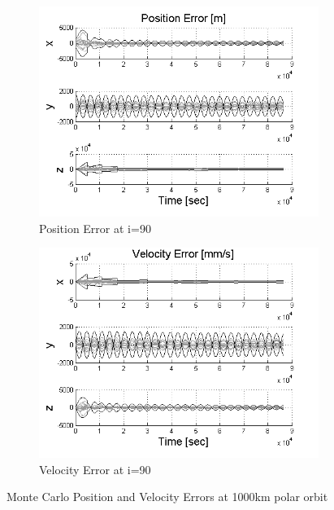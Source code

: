 \documentclass[]{aiaa-tc}%
\begin{document}
\begin{figure}[ht!]
\centering
\begin{subfigure}{.5\textwidth}
  \centering
  \includegraphics[width=0.9\linewidth]{MC_pos90}
  \caption{Position Error at i=90\degree}
  \label{fig:mcpos}
\end{subfigure}%
\begin{subfigure}{.5\textwidth} 
  \centering
  \includegraphics[width=0.9\linewidth]{MC_vel90}
  \caption{Velocity Error at i=90\degree}
  \label{fig:coastline}
\end{subfigure}
\caption{Monte Carlo Position and Velocity Errors at 1000km polar orbit}
\label{fig:mcvel}
\end{figure}
%
\end{document}
